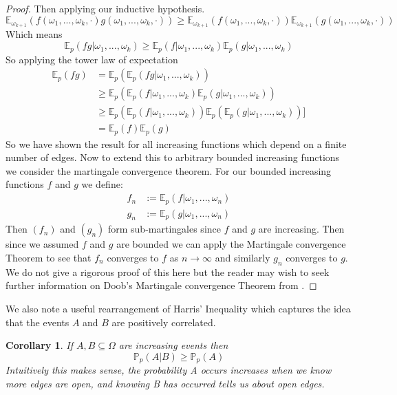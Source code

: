 \documentclass[a4paper,11pt]{article}
\newtheorem{corollary}[theorem]{Corollary}
\theoremstyle{definition}
\newcommand{\prob}{\mathbb{P}_p}
\newcommand{\expp}{\mathbb{E}_p}
\begin{document}
\begin{proof}
	Then applying our inductive hypothesis.
	$$\mathbb{E}_{\omega_{k+1}}(f(\omega_1,...,\omega_k,\cdot)g(\omega_1,...,\omega_k,\cdot))
	\geq \mathbb{E}_{\omega_{k+1}}(f(\omega_1,...,\omega_k,\cdot))\mathbb{E}_{\omega_{k+1}}(g(\omega_1,...,\omega_k,\cdot))$$
	Which means
	$$ \mathbb{E}_p(fg|\omega_1,...,\omega_k) \geq \mathbb{E}_p(f|\omega_1,...,\omega_k)\mathbb{E}_p(g|\omega_1,...,\omega_k)$$
	So applying the tower law of expectation 
	\begin{align*}
		\expp(fg) &= \expp(\expp(fg|\omega_1,...,\omega_k))\\
		&\geq \expp(\expp(f|\omega_1,...,\omega_k)\expp(g|\omega_1,...,\omega_k))\\
		&\geq \expp(\expp(f|\omega_1,...,\omega_k))\expp(\expp(g|\omega_1,...,\omega_k))]\\
		&= \expp(f)\expp(g)
	\end{align*}
	So we have shown the result for all increasing functions which depend on a finite number of edges.
	Now to extend this to arbitrary bounded increasing functions we consider the martingale convergence theorem.
	For our bounded increasing functions $f$ and $g$ we define:
	\begin{align*}
		f_n &:= \expp(f | \omega_1,...,\omega_n)\\
		g_n &:= \expp(g | \omega_1,...,\omega_n)
	\end{align*}
	Then $(f_n)$ and $(g_n)$ form sub-martingales since $f$ and $g$ are increasing. 
	Then since we assumed $f$ and $g$ are bounded we can apply the Martingale convergence Theorem to see that $f_n$ converges to $f$  as $n \rightarrow \infty$ and similarly $g_n$ converges to $g$.
	We do not give a rigorous proof of this here but the reader may wish to seek further information on Doob's Martingale convergence Theorem from \cite{williams_1991}.
	

\end{proof}
We also note a useful rearrangement of Harris' Inequality which captures the idea that the events $A$ and $B$ are positively correlated.
\begin{corollary}
	If $A, B \subseteq \Omega$ are increasing events then 
	$$\prob(A|B) \geq \prob(A)$$
	Intuitively this makes sense, the probability A occurs increases when we know more edges are open, and knowing B has occurred tells us about open edges.
\end{corollary}
\end{document}

